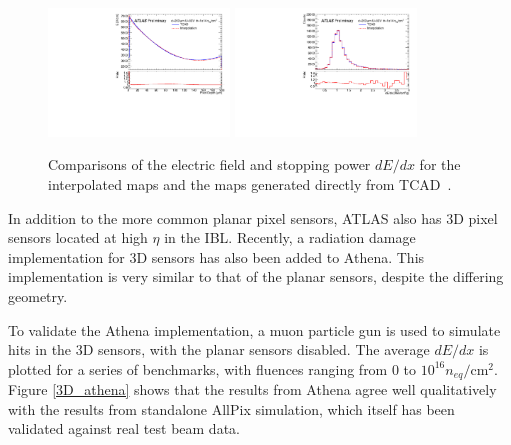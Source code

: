 \begin{figure}[htbp]
\begin{center}
\includegraphics[width=0.43\textwidth]{figures/SensorSimulation/interpolation_EField.pdf}
\includegraphics[width=0.43\textwidth]{figures/SensorSimulation/interpolation_dEdx.pdf}
\caption{Comparisons of the electric field and stopping power $dE/dx$ for the interpolated maps and the maps generated directly from TCAD~\cite{PIX-2018-004}.}
\label{interpolation}
\end{center}
\end{figure}




In addition to the more common planar pixel sensors, ATLAS also has 3D pixel sensors located at high $\eta$ in the IBL. Recently, a radiation damage implementation for 3D sensors has also been added to Athena. This implementation is very similar to that of the planar sensors, despite the differing geometry.

To validate the Athena implementation, a muon particle gun is used to simulate hits in the 3D sensors, with the planar sensors disabled. The average $dE/dx$ is plotted for a series of benchmarks, with fluences ranging from 0 to $10^{16} n_{eq}/$cm$^2$. Figure \ref{3D_athena} shows that the results from Athena agree well qualitatively with the results from standalone AllPix simulation, which itself has been validated against real test beam data. 

